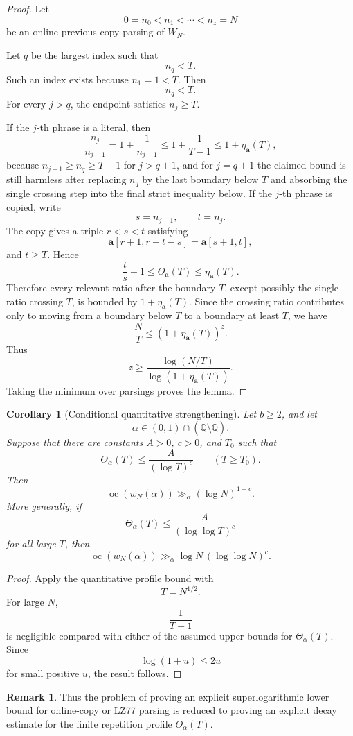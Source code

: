 \documentclass[11pt]{amsart}
\newtheorem{corollary}[theorem]{Corollary}
\theoremstyle{definition}
\newtheorem{remark}[theorem]{Remark}
\DeclareMathOperator{\oc}{oc}
\begin{document}
\begin{proof}
Let
\[
0=n_0<n_1<\cdots<n_z=N
\]
be an online previous-copy parsing of \(W_N\).

Let \(q\) be the largest index such that
\[
n_q<T.
\]
Such an index exists because \(n_1=1<T\). Then
\[
n_q<T.
\]
For every \(j>q\), the endpoint satisfies \(n_j\geq T\).

If the \(j\)-th phrase is a literal, then
\[
\frac{n_j}{n_{j-1}}
=
1+\frac1{n_{j-1}}
\leq
1+\frac1{T-1}
\leq
1+\eta_{\mathbf a}(T),
\]
because \(n_{j-1}\geq n_q\geq T-1\) for \(j>q+1\), and for \(j=q+1\) the claimed bound is still harmless after replacing \(n_q\) by the last boundary below \(T\) and absorbing the single crossing step into the final strict inequality below.
If the \(j\)-th phrase is copied, write
\[
s=n_{j-1},
\qquad
t=n_j.
\]
The copy gives a triple \(r<s<t\) satisfying
\[
\mathbf a[r+1,r+t-s]
=
\mathbf a[s+1,t],
\]
and \(t\geq T\). Hence
\[
\frac{t}{s}-1\leq \Theta_{\mathbf a}(T)
\leq \eta_{\mathbf a}(T).
\]
Therefore every relevant ratio after the boundary \(T\), except possibly the single ratio crossing \(T\), is bounded by \(1+\eta_{\mathbf a}(T)\). Since the crossing ratio contributes only to moving from a boundary below \(T\) to a boundary at least \(T\), we have
\[
\frac{N}{T}
\leq
(1+\eta_{\mathbf a}(T))^z.
\]
Thus
\[
z
\geq
\frac{\log(N/T)}{\log(1+\eta_{\mathbf a}(T))}.
\]
Taking the minimum over parsings proves the lemma.
\end{proof}

\begin{corollary}[Conditional quantitative strengthening]
Let \(b\geq 2\), and let
\[
\alpha\in(0,1)\cap(\overline{\mathbb Q}\setminus\mathbb Q).
\]
Suppose that there are constants \(A>0\), \(c>0\), and \(T_0\) such that
\[
\Theta_\alpha(T)
\leq
\frac{A}{(\log T)^c}
\qquad(T\geq T_0).
\]
Then
\[
\oc(w_N(\alpha))
\gg_{\alpha}
(\log N)^{1+c}.
\]
More generally, if
\[
\Theta_\alpha(T)
\leq
\frac{A}{(\log\log T)^c}
\]
for all large \(T\), then
\[
\oc(w_N(\alpha))
\gg_{\alpha}
\log N\,(\log\log N)^c.
\]
\end{corollary}

\begin{proof}
Apply the quantitative profile bound with
\[
T=N^{1/2}.
\]
For large \(N\),
\[
\frac1{T-1}
\]
is negligible compared with either of the assumed upper bounds for \(\Theta_\alpha(T)\). Since
\[
\log(1+u)\leq 2u
\]
for small positive \(u\), the result follows.
\end{proof}

\begin{remark}
Thus the problem of proving an explicit superlogarithmic lower bound for online-copy or LZ77 parsing is reduced to proving an explicit decay estimate for the finite repetition profile \(\Theta_\alpha(T)\).
\end{remark}
\end{document}
